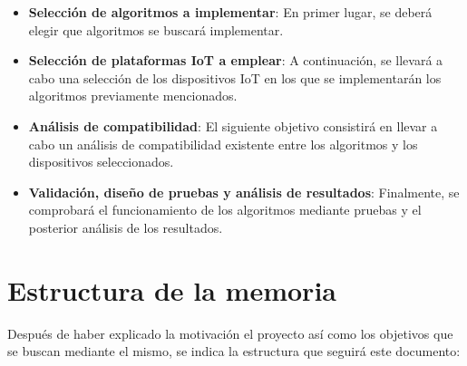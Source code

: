 \begin{itemize}
    \item \textbf{Selección de algoritmos a implementar}: En primer lugar, se deberá elegir que algoritmos se buscará implementar.
    \item \textbf{Selección de plataformas \ac{IoT} a emplear}: A continuación, se llevará a cabo una selección de los dispositivos \ac{IoT} en los que se implementarán los algoritmos previamente mencionados.
    \item \textbf{Análisis de compatibilidad}: El siguiente objetivo consistirá en llevar a cabo un análisis de compatibilidad existente entre los algoritmos y los dispositivos seleccionados.
    \item \textbf{Validación, diseño de pruebas y análisis de resultados}: Finalmente, se comprobará el funcionamiento de los algoritmos mediante pruebas y el posterior análisis de los resultados.
\end{itemize}


\section{Estructura de la memoria}\label{sec:estructura}

Después de haber explicado la motivación el proyecto así como los objetivos que se buscan mediante el mismo, se indica la estructura que seguirá este documento:

